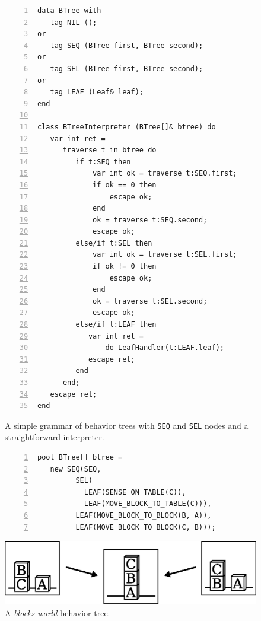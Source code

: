 \documentclass{sig-alternate}
\newcommand{\code}[1] {{\small{\texttt{#1}}}}
\begin{document}
\begin{figure}[t]
\begin{lstlisting}[numbers=left,xleftmargin=3em]
data BTree with
   tag NIL ();
or
   tag SEQ (BTree first, BTree second);
or
   tag SEL (BTree first, BTree second);
or
   tag LEAF (Leaf& leaf);
end

class BTreeInterpreter (BTree[]& btree) do
   var int ret =
      traverse t in btree do
         if t:SEQ then
             var int ok = traverse t:SEQ.first;
             if ok == 0 then
                 escape ok;
             end
             ok = traverse t:SEQ.second;
             escape ok;
         else/if t:SEL then
             var int ok = traverse t:SEL.first;
             if ok != 0 then
                 escape ok;
             end
             ok = traverse t:SEL.second;
             escape ok;
         else/if t:LEAF then
            var int ret =
                do LeafHandler(t:LEAF.leaf);
            escape ret;
         end
      end;
   escape ret;
end
\end{lstlisting}
\caption{
A simple grammar of behavior trees with \code{SEQ} and \code{SEL} nodes and a 
straightforward interpreter.
\label{lst.bt1}
}
\end{figure}

\begin{figure}[h]
\begin{lstlisting}[numbers=left,xleftmargin=3em]
pool BTree[] btree =
   new SEQ(SEQ,
         SEL(
           LEAF(SENSE_ON_TABLE(C)),
           LEAF(MOVE_BLOCK_TO_TABLE(C))),
         LEAF(MOVE_BLOCK_TO_BLOCK(B, A)),
         LEAF(MOVE_BLOCK_TO_BLOCK(C, B)));
\end{lstlisting}

\centerline{\includegraphics[scale=0.35]{blocksworld2.eps}}
\caption{ A \emph{blocks world} behavior tree.
\label{lst.bt1.example}
}
\end{figure}
\end{document}
